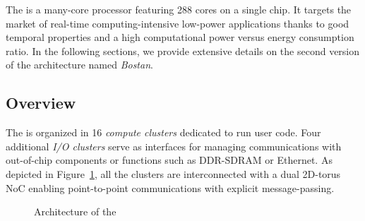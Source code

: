\documentclass[main.tex]{subfiles}
\begin{document}


The \mppalong \cite{kalray_mppa} is a many-core processor featuring 288 cores on a single chip. It targets the market of real-time computing-intensive low-power applications thanks to good temporal properties and a high computational power versus energy consumption ratio. In the following sections, we provide extensive details on the second version of the \mppalong architecture named \emph{Bostan}.

\subsection{Overview}
The \mppalong is organized in 16 \emph{compute clusters} dedicated to run user code. Four additional \emph{I/O clusters} serve as interfaces for managing communications with out-of-chip components or functions such as DDR-SDRAM or Ethernet. As depicted in Figure~\ref{fig_execModel_MPPANoCtopology}, all the clusters are interconnected with a dual 2D-torus NoC enabling point-to-point communications with explicit message-passing. 

\begin{figure}
    \centering
    \scalebox{1.5}{}
    \caption{Architecture of the \mppalong}
    \label{fig_execModel_MPPANoCtopology}
\end{figure} 
\end{document}
